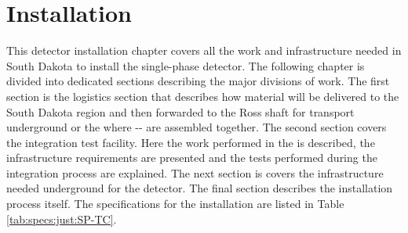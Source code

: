 \chapter{Installation}
\label{ch:sp-tc}



This  detector installation chapter covers all the work and infrastructure needed in South Dakota to install the single-phase detector. 
The following chapter is divided into dedicated sections describing the major divisions of work. 
The first section is the logistics section that describes how material will be delivered to the South Dakota region and then forwarded to the Ross shaft for transport underground or the 
 where -- are assembled together. 
The second section covers the integration test facility. 
Here the work performed in the  is described, the  infrastructure requirements are presented and the tests performed during the integration process are explained. 
The next section is covers the infrastructure needed underground for the detector. 
The final section describes the installation process itself. 
The specifications for the installation are listed in Table \ref{tab:specs:just:SP-TC}.

















%




 
 



